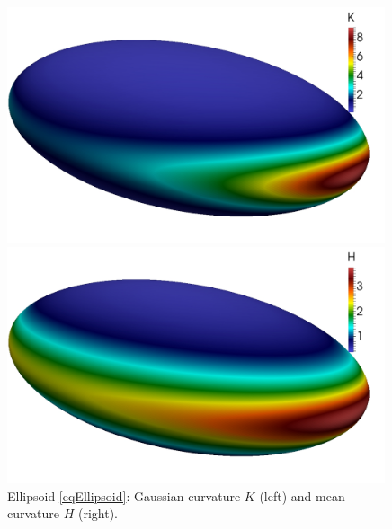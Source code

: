   \begin{figure}
    \begin{minipage}[htp]{.23\textwidth}
      \centering
      \includegraphics[width=0.99\textwidth]{bilder/ellipsoid/K.jpg}
    \end{minipage}\hfill
    \begin{minipage}[htp]{.23\textwidth}
      \centering
      \includegraphics[width=0.99\textwidth]{bilder/ellipsoid/H.jpg}
    \end{minipage}
    \caption{Ellipsoid \eqref{eqEllipsoid}: Gaussian curvature \( K \) (left) and mean curvature \( H \) (right).}
    \label{figEllipsoid}
  \end{figure}

